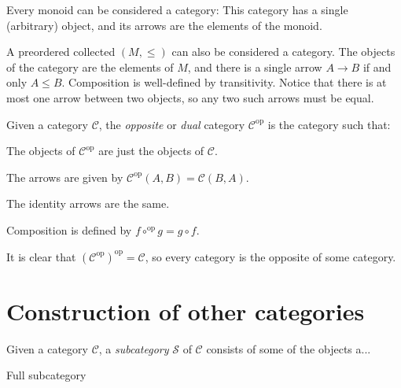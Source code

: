 \documentclass[article, a4paper, 11pt, oneside]{memoir}
\numberwithin{equation}{chapter}
\newcommand{\cat}[1]{\mathcal{#1}}
\newcommand{\catC}{\cat{C}}
\newcommand{\catS}{\cat{S}}
\newcommand{\op}{\mathrm{op}}
\begin{document}
\begin{examplebreak}
    \begin{enumexample}
        \item Every monoid can be considered a category: This category has a single (arbitrary) object, and its arrows are the elements of the monoid.
        
        \item A preordered collected $(M, \leq)$ can also be considered a category. The objects of the category are the elements of $M$, and there is a single arrow $A \to B$ if and only $A \leq B$. Composition is well-defined by transitivity. Notice that there is at most one arrow between two objects, so any two such arrows must be equal.
    \end{enumexample}
\end{examplebreak}


\begin{definition}
    Given a category $\catC$, the \emph{opposite} or \emph{dual} category $\catC^\op$ is the category such that:
    \begin{enumdef}
        \item The objects of $\catC^\op$ are just the objects of $\catC$.
        
        \item The arrows are given by $\catC^\op(A,B) = \catC(B,A)$.
        
        \item The identity arrows are the same.
        
        \item Composition is defined by $f \circ^\op g = g \circ f$.
    \end{enumdef}
\end{definition}
%
It is clear that $(\catC^\op)^\op = \catC$, so every category is the opposite of some category.



\chapter{Construction of other categories}

\begin{definition}[Subcategories]
    Given a category $\catC$, a \emph{subcategory} $\catS$ of $\catC$ consists of some of the objects a...

    Full subcategory
\end{definition}
\end{document}
